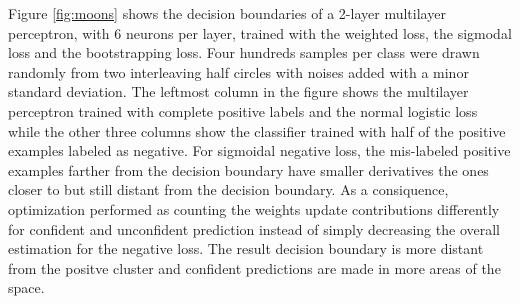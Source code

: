 Figure \ref{fig:moons} shows the decision boundaries of a 2-layer multilayer perceptron, with 6 neurons per layer, trained with the weighted loss, the sigmodal loss and the bootstrapping loss.
Four hundreds samples per class were drawn randomly from two interleaving half circles with noises added with a minor standard deviation.
The leftmost column in the figure shows the multilayer perceptron trained with complete positive labels and the normal logistic loss while the other three columns show the classifier trained with half of the positive examples labeled as negative.
For sigmoidal negative loss, the mis-labeled positive examples farther from the decision boundary have smaller derivatives the ones closer to but still distant from the decision boundary.
As a consiquence, optimization performed as counting the weights update contributions differently for confident and unconfident prediction instead of simply decreasing the overall estimation for the negative loss.
The result decision boundary is more distant from the positve cluster and confident predictions are made in more areas of the space.


